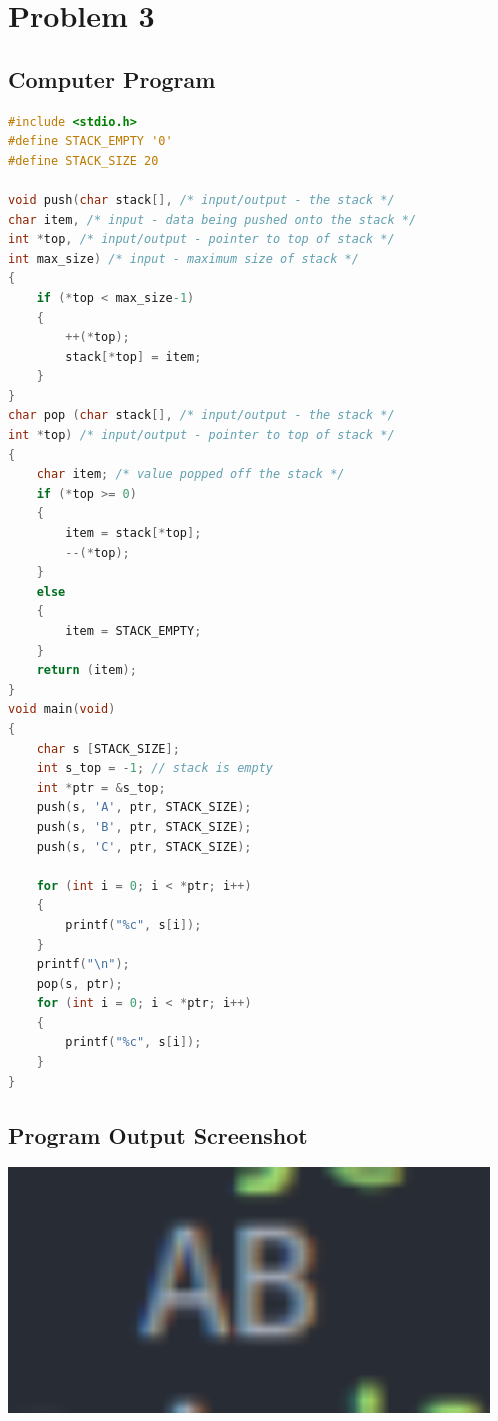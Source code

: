 \section{{Problem 3}}
	
	\subsection{{Computer Program}}
	
		\begin{lstlisting}[language=C, caption=\textit{}]	
#include <stdio.h>
#define STACK_EMPTY '0'
#define STACK_SIZE 20

void push(char stack[], /* input/output - the stack */
char item, /* input - data being pushed onto the stack */
int *top, /* input/output - pointer to top of stack */
int max_size) /* input - maximum size of stack */
{
    if (*top < max_size-1)
    {
        ++(*top);
        stack[*top] = item;
    }
}
char pop (char stack[], /* input/output - the stack */
int *top) /* input/output - pointer to top of stack */
{
    char item; /* value popped off the stack */
    if (*top >= 0)
    {
        item = stack[*top];
        --(*top);
    }
    else
    {
        item = STACK_EMPTY;
    }
    return (item);
}
void main(void)
{
    char s [STACK_SIZE];
    int s_top = -1; // stack is empty
    int *ptr = &s_top;
    push(s, 'A', ptr, STACK_SIZE);
    push(s, 'B', ptr, STACK_SIZE);
    push(s, 'C', ptr, STACK_SIZE);

    for (int i = 0; i < *ptr; i++)
    {
        printf("%c", s[i]);
    }
    printf("\n");
    pop(s, ptr);
    for (int i = 0; i < *ptr; i++)
    {
        printf("%c", s[i]);
    }
}

	\end{lstlisting}
	
	\subsection{{Program Output Screenshot}}
	
		{}
		
		\includegraphics[width=12.75cm]{problem3.png}
		
		
		